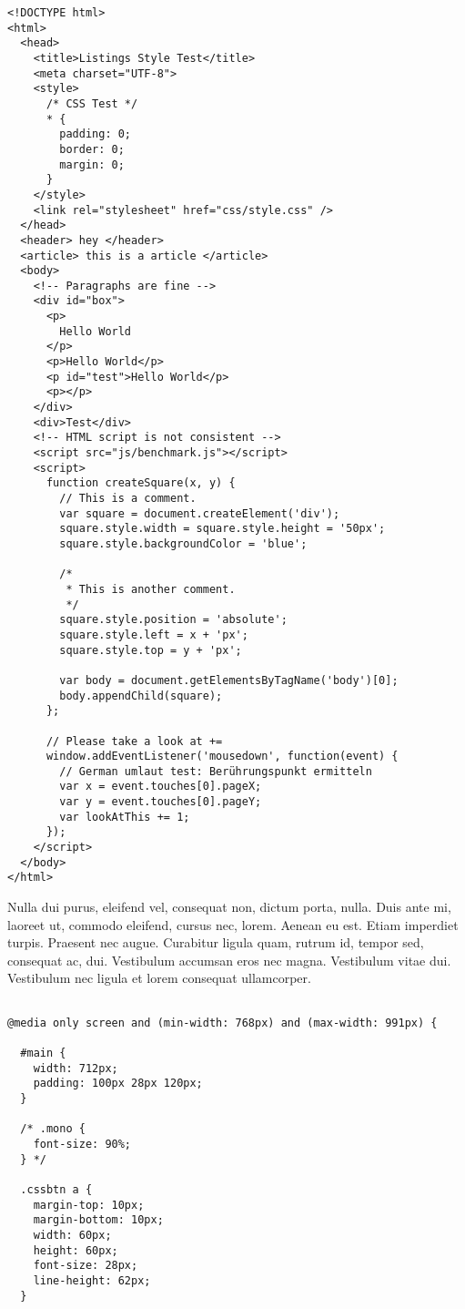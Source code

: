 \begin{lstlisting}[style=htmlcssjs,caption={HTML with CSS Code}]
<!DOCTYPE html>
<html>
  <head>
    <title>Listings Style Test</title>
    <meta charset="UTF-8">
    <style>
      /* CSS Test */
      * {
        padding: 0;
        border: 0;
        margin: 0;
      }
    </style>
    <link rel="stylesheet" href="css/style.css" />
  </head>
  <header> hey </header>
  <article> this is a article </article>
  <body>
    <!-- Paragraphs are fine -->
    <div id="box">      
      <p>
        Hello World
      </p>
      <p>Hello World</p>
      <p id="test">Hello World</p>
      <p></p>
    </div>
    <div>Test</div>
    <!-- HTML script is not consistent -->
    <script src="js/benchmark.js"></script>
    <script>
      function createSquare(x, y) {
        // This is a comment.
        var square = document.createElement('div');
        square.style.width = square.style.height = '50px';
        square.style.backgroundColor = 'blue';
        
        /*
         * This is another comment.
         */
        square.style.position = 'absolute';
        square.style.left = x + 'px'; 
        square.style.top = y + 'px';
        
        var body = document.getElementsByTagName('body')[0];
        body.appendChild(square);
      };
      
      // Please take a look at +=
      window.addEventListener('mousedown', function(event) {
        // German umlaut test: Berührungspunkt ermitteln
        var x = event.touches[0].pageX;
        var y = event.touches[0].pageY;
        var lookAtThis += 1;
      });
    </script>
  </body>
</html>
\end{lstlisting}

Nulla dui purus, eleifend vel, consequat non, dictum porta, nulla. Duis ante mi, laoreet ut, commodo eleifend, cursus nec, lorem. Aenean eu est. Etiam imperdiet turpis. Praesent nec augue. Curabitur ligula quam, rutrum id, tempor sed, consequat ac, dui. Vestibulum accumsan eros nec magna. Vestibulum vitae dui. Vestibulum nec ligula et lorem consequat ullamcorper.

\begin{lstlisting}[style=htmlcssjs,caption={HTML CSS Javascript Code}]

@media only screen and (min-width: 768px) and (max-width: 991px) {
  
  #main {
    width: 712px;
    padding: 100px 28px 120px;
  }
  
  /* .mono {
    font-size: 90%;
  } */
  
  .cssbtn a {
    margin-top: 10px;
    margin-bottom: 10px;
    width: 60px;  
    height: 60px;   
    font-size: 28px;
    line-height: 62px;
  }
\end{lstlisting}

